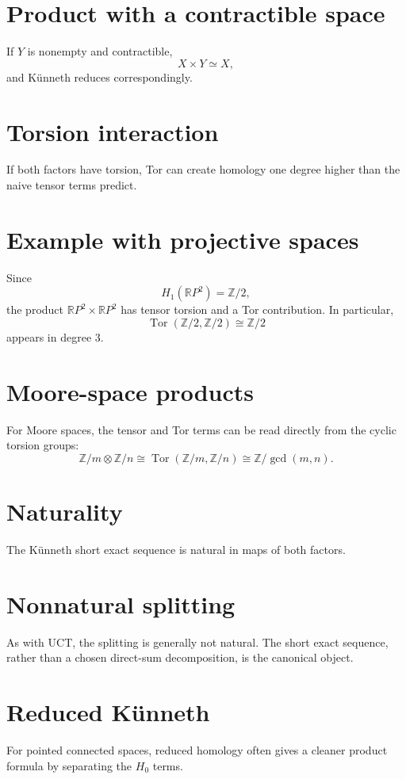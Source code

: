 \section{Product with a contractible space}
If \(Y\) is nonempty and contractible,
\[
X\times Y\simeq X,
\]
and Künneth reduces correspondingly.

\section{Torsion interaction}
If both factors have torsion, Tor can create homology one degree higher than the
naive tensor terms predict.

\section{Example with projective spaces}
Since
\[
H_1(\mathbb RP^2)=\mathbb Z/2,
\]
the product \(\mathbb RP^2\times\mathbb RP^2\) has tensor torsion and a Tor
contribution.  In particular,
\[
\operatorname{Tor}(\mathbb Z/2,\mathbb Z/2)\cong\mathbb Z/2
\]
appears in degree \(3\).

\section{Moore-space products}
For Moore spaces, the tensor and Tor terms can be read directly from the cyclic
torsion groups:
\[
\mathbb Z/m\otimes\mathbb Z/n
\cong
\operatorname{Tor}(\mathbb Z/m,\mathbb Z/n)
\cong
\mathbb Z/\gcd(m,n).
\]

\section{Naturality}
The Künneth short exact sequence is natural in maps of both factors.

\section{Nonnatural splitting}
As with UCT, the splitting is generally not natural.  The short exact sequence,
rather than a chosen direct-sum decomposition, is the canonical object.

\section{Reduced Künneth}
For pointed connected spaces, reduced homology often gives a cleaner product
formula by separating the \(H_0\) terms.

